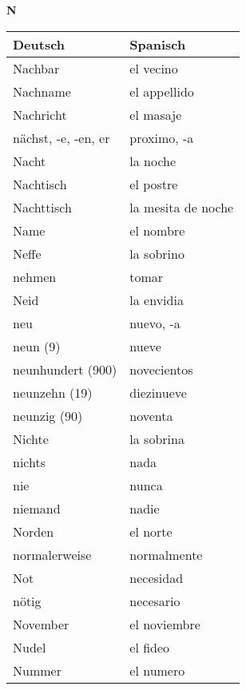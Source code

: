 \begin{flushright}\begin{Huge}\textbf{N}\end{Huge}\end{flushright}

\begin{longtable}{p{} p{}} 
\textbf{Deutsch}     & \textbf{Spanisch}                                       \\ \hline
\hline
\endhead %
Nachbar & el vecino \\
Nachname & el appellido \\
Nachricht & el masaje\\
nächst, -e, -en, er & proximo, -a\\
Nacht & la noche \\
Nachtisch & el postre\\
Nachttisch & la mesita de noche\\
Name & el nombre \\
Neffe & la sobrino\\
nehmen & tomar\\
Neid & la envidia \\
neu & nuevo, -a\\
neun (9) & nueve\\
neunhundert (900) & novecientos\\
neunzehn (19) & diezinueve\\
neunzig (90) & noventa\\
Nichte & la sobrina\\
nichts & nada\\
nie & nunca \\
niemand & nadie \\
Norden & el norte \\
normalerweise & normalmente\\
Not & necesidad \\
nötig & necesario\\
November & el noviembre \\
Nudel & el fideo\\
Nummer & el numero \\

\end{longtable}
